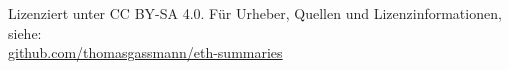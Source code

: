 
\begin{center}
    Lizenziert unter CC BY-SA 4.0. Für Urheber, Quellen und Lizenzinformationen, siehe:\\
    \href{https://github.com/thomasgassmann/eth-summaries}{github.com/thomasgassmann/eth-summaries}
\end{center}
